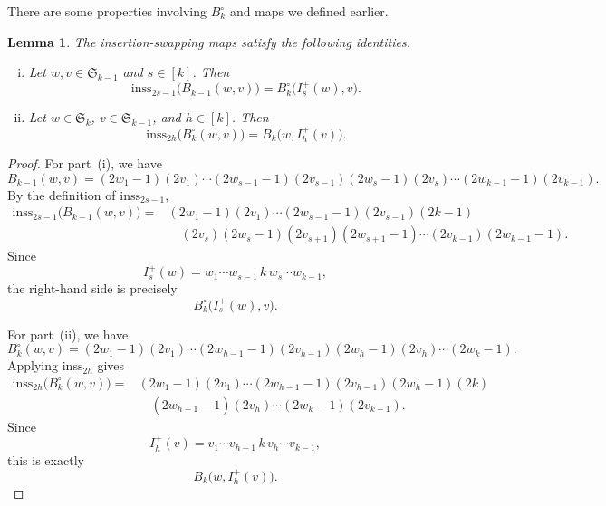 \documentclass[12pt]{amsart}
\newtheorem{lem}[thm]{Lemma}
\theoremstyle{definition}
\numberwithin{equation}{section}
\newcommand{\inss}[1]{\mathrm{inss}_{#1}}
\begin{document}
There are some properties involving $B_k^{\circ}$ and maps we defined earlier.

\begin{lem}\label{l:B circ with inss}
The insertion-swapping maps satisfy the following identities.

\begin{enumerate}[(i)]
    \item Let $w,v\in\mathfrak S_{k-1}$ and $s\in[k]$. Then
    \begin{equation*}
        \inss{2s-1}\bigl(B_{k-1}(w,v)\bigr)
        =
        B_k^\circ\bigl(I_s^+(w),v\bigr).
    \end{equation*}

    \item Let $w\in\mathfrak S_k$, $v\in\mathfrak S_{k-1}$, and
    $h\in[k]$. Then
    \begin{equation*}
        \inss{2h}\bigl(B_k^\circ(w,v)\bigr)
        =
        B_k\bigl(w,I_h^+(v)\bigr).
    \end{equation*}
\end{enumerate}
\end{lem}

\begin{proof}
For part~(i), we have
\begin{equation*}
B_{k-1}(w,v)
=
(2w_1-1)(2v_1)\cdots
(2w_{s-1}-1)(2v_{s-1})
(2w_s-1)(2v_s)\cdots
(2w_{k-1}-1)(2v_{k-1}).
\end{equation*}
By the definition of $\inss{2s-1}$,
\begin{align*}
\inss{2s-1}\bigl(B_{k-1}(w,v)\bigr)
={}&
(2w_1-1)(2v_1)\cdots
(2w_{s-1}-1)(2v_{s-1})(2k-1)\\
&\quad
(2v_s)(2w_s-1)
(2v_{s+1})(2w_{s+1}-1)\cdots
(2v_{k-1})(2w_{k-1}-1).
\end{align*}
Since
\begin{equation*}
I_s^+(w)
=
w_1\cdots w_{s-1}\,k\,w_s\cdots w_{k-1},
\end{equation*}
the right-hand side is precisely
\begin{equation*}
B_k^\circ\bigl(I_s^+(w),v\bigr).
\end{equation*}

For part~(ii), we have
\begin{equation*}
B_k^\circ(w,v)
=
(2w_1-1)(2v_1)\cdots
(2w_{h-1}-1)(2v_{h-1})
(2w_h-1)(2v_h)\cdots
(2w_k-1).
\end{equation*}
Applying $\inss{2h}$ gives
\begin{align*}
\inss{2h}\bigl(B_k^\circ(w,v)\bigr)
={}&
(2w_1-1)(2v_1)\cdots
(2w_{h-1}-1)(2v_{h-1})(2w_h-1)(2k)\\
&\quad
(2w_{h+1}-1)(2v_h)\cdots
(2w_k-1)(2v_{k-1}).
\end{align*}
Since
\begin{equation*}
I_h^+(v)
=
v_1\cdots v_{h-1}\,k\,v_h\cdots v_{k-1},
\end{equation*}
this is exactly
\begin{equation*}
B_k\bigl(w,I_h^+(v)\bigr).
\end{equation*}
\end{proof}
\end{document}
